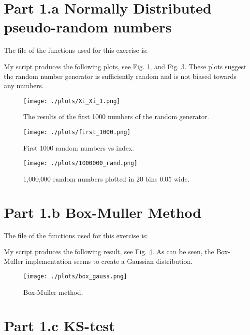 \section{Part 1.a Normally Distributed pseudo-random numbers}

The file of the functions used for this exercise is:



My script produces the following plots, see Fig. \ref{fig:xi_xi}, and Fig. \ref{fig:million}.
These plots suggest the random number generator is sufficiently random and is not biased towards any numbers.

\begin{figure}[h!]
  \centering
  \texttt{[image: ./plots/Xi\_Xi\_1.png]}
  \caption{The results of the first 1000 numbers of the random generator. }
  \label{fig:xi_xi}
\end{figure}

\begin{figure}[h!]
  \centering
  \texttt{[image: ./plots/first\_1000.png]}
  \caption{First 1000 random numbers vs index.}
  \label{fig:thousand}
\end{figure}

\begin{figure}[h!]
  \centering
  \texttt{[image: ./plots/1000000\_rand.png]}
  \caption{1,000,000 random numbers plotted in 20 bins 0.05 wide.}
  \label{fig:million}
\end{figure}


\section{Part 1.b Box-Muller Method}

The file of the functions used for this exercise is:



My script produces the following result, see Fig. \ref{fig:boxmuller}. As can be seen, the Box-Muller implementation seems
to create a Gaussian distribution.

\begin{figure}[h!]
  \centering
  \texttt{[image: ./plots/box\_gauss.png]}
  \caption{Box-Muller method.}
  \label{fig:boxmuller}
\end{figure}


\section{Part 1.c KS-test}


